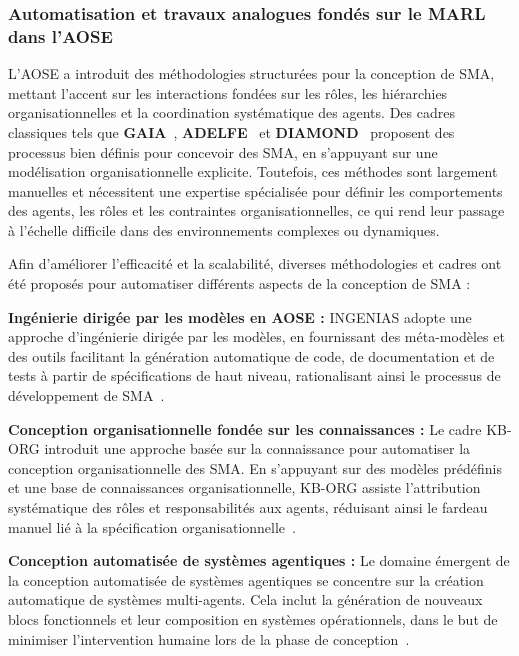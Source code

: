 \subsubsection{Automatisation et travaux analogues fondés sur le MARL dans l'AOSE}\label{sub-sec:rel_aose_automate_marl}

L'AOSE a introduit des méthodologies structurées pour la conception de SMA, mettant l'accent sur les interactions fondées sur les rôles, les hiérarchies organisationnelles et la coordination systématique des agents. Des cadres classiques tels que \textbf{GAIA}~\cite{gaia1998}, \textbf{ADELFE}~\cite{adelfe2002} et \textbf{DIAMOND}~\cite{Jamont2005} proposent des processus bien définis pour concevoir des SMA, en s'appuyant sur une modélisation organisationnelle explicite. Toutefois, ces méthodes sont largement manuelles et nécessitent une expertise spécialisée pour définir les comportements des agents, les rôles et les contraintes organisationnelles, ce qui rend leur passage à l'échelle difficile dans des environnements complexes ou dynamiques.

Afin d'améliorer l'efficacité et la scalabilité, diverses méthodologies et cadres ont été proposés pour automatiser différents aspects de la conception de SMA :

\textbf{Ingénierie dirigée par les modèles en AOSE :} INGENIAS adopte une approche d'ingénierie dirigée par les modèles, en fournissant des méta-modèles et des outils facilitant la génération automatique de code, de documentation et de tests à partir de spécifications de haut niveau, rationalisant ainsi le processus de développement de SMA~\cite{pavon2005agent}.

\textbf{Conception organisationnelle fondée sur les connaissances :} Le cadre KB-ORG introduit une approche basée sur la connaissance pour automatiser la conception organisationnelle des SMA. En s'appuyant sur des modèles prédéfinis et une base de connaissances organisationnelle, KB-ORG assiste l'attribution systématique des rôles et responsabilités aux agents, réduisant ainsi le fardeau manuel lié à la spécification organisationnelle~\cite{dignum2001kb}.

\textbf{Conception automatisée de systèmes agentiques :} Le domaine émergent de la conception automatisée de systèmes agentiques se concentre sur la création automatique de systèmes multi-agents. Cela inclut la génération de nouveaux blocs fonctionnels et leur composition en systèmes opérationnels, dans le but de minimiser l'intervention humaine lors de la phase de conception~\cite{smith2024automated}.

